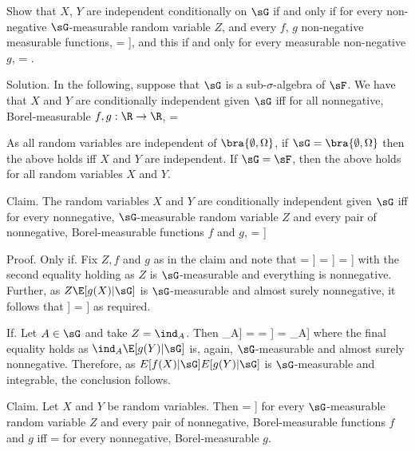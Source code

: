 Show that $X$, $Y$ are independent conditionally on $\sG$ if and only if for every non-negative $\sG$-measurable random variable $Z$, and every $f$, $g$ non-negative measurable functions,
\be
\E[f(X)g(Y )Z] = \E[f(X)Z\E[g(Y )|G]],
\ee
and this if and only for every measurable non-negative $g$,
\be
{} = \E[g(Y )|G].
\ee

\scutline

Solution. In the following, suppose that $\sG$ is a sub-$\sigma$-algebra of $\sF$. We have that $X$ and $Y$ are conditionally independent given $\sG$ iff for all nonnegative, Borel-measurable $f ,g: \R\to \R$,
\be
\E[ f (X)g(Y)|\sG ] = \E[ f (X)|\sG ]\E[g(Y)|\sG ] 
\ee

As all random variables are independent of $\bra{\emptyset,\Omega}$, if $\sG = \bra{\emptyset,\Omega}$ then the above holds iff $X$ and $Y$ are independent. If $\sG = \sF$, then the above holds for all random variables $X$ and $Y$.

Claim. The random variables $X$ and $Y$ are conditionally independent given $\sG$ iff for every nonnegative, $\sG$-measurable random variable $Z$ and every pair of nonnegative, Borel-measurable functions $f$ and $g$,
\be
\E[ f (X)g(Y)Z] = \E[ f (X)Z\E[g(Y)|\sG ]]
\ee

Proof. Only if. Fix $Z, f$ and $g$ as in the claim and note that
\be
\E[ f (X)g(Y)Z] = \E[\E[ f (X)g(Y)Z|\sG ]] = \E[Z\E[ f (X)g(Y)|\sG ]] = \E[Z\E[ f (X)|\sG ]\E[g(Y)|\sG ]]
\ee
with the second equality holding as $Z$ is $\sG$-measurable and everything is nonnegative. Further, as $Z\E[g(X)|\sG ]$ is $\sG$-measurable and almost surely nonnegative, it follows that
\be
\E[Z\E[ f (X)|\sG ]\E[g(Y)|\sG ]] = \E[ f (X)Z\E[g(Y)|\sG ]]
\ee
as required.

If. Let $A \in \sG$ and take $Z = \ind_A$. Then
\be
\E[\E[ f (X)g(Y)|\sG ]\ind_A] = \E[ f (X)g(Y)\ind_A] = \E[ f (X)\ind_A \E[g(Y)|\sG ]] = \E[\E[ f (X)|\sG ]\E[g(Y)|\sG ]\ind_A]
\ee
where the final equality holds as $\ind_A\E[g(Y)|\sG ]$ is, again, $\sG$-measurable and almost surely nonnegative. Therefore, as $E[ f (X)|\sG ]E[g(Y)|\sG ]$ is $\sG$-measurable and integrable, the conclusion follows.

Claim. Let $X$ and $Y$ be random variables. Then
\be
\E[ f (X)g(Y)Z] = \E[ f (X)Z\E[g(Y)|\sG ]]
\ee
for every $\sG$-measurable random variable $Z$ and every pair of nonnegative, Borel-measurable functions $f$ and $g$ iff
\be
{} = \E[g(Y)|\sG ]
\ee
for every nonnegative, Borel-measurable $g$.

